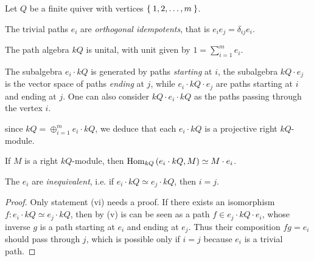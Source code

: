 \begin{prop}
	Let $Q$ be a finite quiver with vertices $\Set{1,2, \dots,m}$.
	\begin{rmnumerate}
		\item The trivial paths $e_{i}$ are \emph{orthogonal idempotents},
		that is $e_{i}e_{j} = \delta_{ij} e_{i}$.
		
		\item The path algebra $kQ$ is unital,
		with unit given by $1 = \sum_{i=1}^{m} e_{i}$.
		
	\item The subalgebra $e_{i} \cdot kQ$ is generated by paths \emph{starting} at $i$,
	the subalgebra $kQ \cdot e_{j}$ is the vector space of paths \emph{ending} at $j$,
	while $e_{i} \cdot kQ \cdot e_{j}$ are paths starting at $i$ and ending at $j$.
	One can also consider $kQ \cdot e_{i} \cdot kQ$ as the paths passing through the vertex $i$.
	
		\item since $kQ = \oplus_{i=1}^{m} e_{i} \cdot kQ$, we deduce that each
		$e_{i} \cdot kQ$ is a projective right $kQ$-module.
		
		\item If $M$ is a right $kQ$-module, 
		then $\operatorname{Hom}_{kQ}\left(e_{i} \cdot kQ, M \right) \simeq M \cdot e_{i}$.
		
		\item The $e_{i}$ are \emph{inequivalent}, i.e. if $e_{i} \cdot kQ \simeq e_{j} \cdot kQ$,
		then $i = j$.
		\begin{proof}
			Only statement (vi) needs a proof. If there exists an isomorphism
			$f : e_{i} \cdot kQ \simeq e_{j} \cdot kQ$,
			then by (v) is can be seen as a path $f \in e_{j} \cdot kQ \cdot e_{i}$,
			whose inverse $g$ is a path starting at $e_{i}$ and ending at $e_{j}$.
			Thus their composition $fg=e_{i}$ should pass through $j$, which is possible only if
			$i=j$ because $e_{i}$ is a trivial path.
		\end{proof}
	\end{rmnumerate}
\end{prop}


